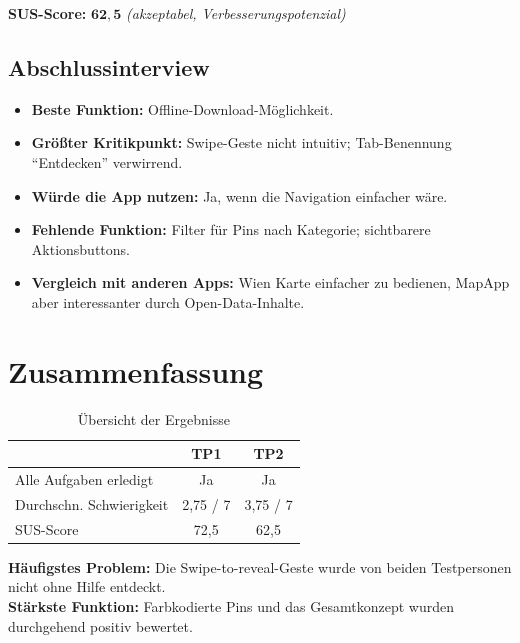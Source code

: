 \documentclass{article}
\begin{document}
\textbf{SUS-Score:} $\mathbf{62{,}5}$ \quad \textit{(akzeptabel, Verbesserungspotenzial)}

\subsection*{Abschlussinterview}

\begin{itemize}
    \item \textbf{Beste Funktion:} Offline-Download-Möglichkeit.
    \item \textbf{Größter Kritikpunkt:} Swipe-Geste nicht intuitiv; Tab-Benennung \enquote{Entdecken} verwirrend.
    \item \textbf{Würde die App nutzen:} Ja, wenn die Navigation einfacher wäre.
    \item \textbf{Fehlende Funktion:} Filter für Pins nach Kategorie; sichtbarere Aktionsbuttons.
    \item \textbf{Vergleich mit anderen Apps:} Wien Karte einfacher zu bedienen,
          MapApp aber interessanter durch Open-Data-Inhalte.
\end{itemize}

\section{Zusammenfassung}

\begin{table}[H]
    \centering
    \begin{tabular}{|l|c|c|}
        \hline
        & \textbf{TP1} & \textbf{TP2} \\
        \hline
        Alle Aufgaben erledigt & Ja & Ja \\
        \hline
        Durchschn. Schwierigkeit & 2{,}75 / 7 & 3{,}75 / 7 \\
        \hline
        SUS-Score & 72{,}5 & 62{,}5 \\
        \hline
    \end{tabular}
    \caption{Übersicht der Ergebnisse}
\end{table}

\textbf{Häufigstes Problem:} Die Swipe-to-reveal-Geste wurde von beiden
Testpersonen nicht ohne Hilfe entdeckt.\\
\textbf{Stärkste Funktion:} Farbkodierte Pins und das Gesamtkonzept
wurden durchgehend positiv bewertet.
\end{document}
